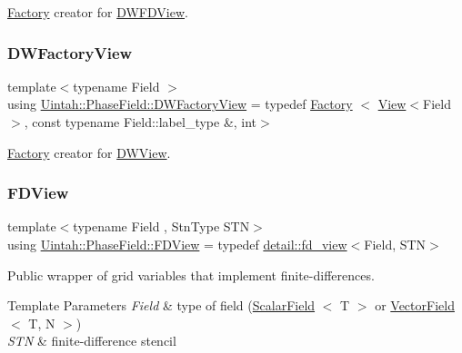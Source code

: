 \hyperlink{classUintah_1_1PhaseField_1_1Factory}{Factory} creator for \hyperlink{classUintah_1_1PhaseField_1_1DWFDView}{D\+W\+F\+D\+View}. 

\mbox{\label{namespaceUintah_1_1PhaseField_a04193a30328f38b29159b738067c8552}} 
\subsubsection{\texorpdfstring{D\+W\+Factory\+View}{DWFactoryView}}
{\footnotesize\ttfamily template$<$typename Field $>$ \\
using \hyperlink{namespaceUintah_1_1PhaseField_a04193a30328f38b29159b738067c8552}{Uintah\+::\+Phase\+Field\+::\+D\+W\+Factory\+View} = typedef \hyperlink{classUintah_1_1PhaseField_1_1Factory}{Factory} $<$ \hyperlink{namespaceUintah_1_1PhaseField_a59210a1e28eba254d428762c92ddeabb}{View}$<$Field$>$, const typename Field\+::label\+\_\+type \&, int$>$}



\hyperlink{classUintah_1_1PhaseField_1_1Factory}{Factory} creator for \hyperlink{classUintah_1_1PhaseField_1_1DWView}{D\+W\+View}. 

\mbox{\label{namespaceUintah_1_1PhaseField_a63032464b1cd54eaa53c1c29109746ac}} 
\subsubsection{\texorpdfstring{F\+D\+View}{FDView}}
{\footnotesize\ttfamily template$<$typename Field , Stn\+Type S\+TN$>$ \\
using \hyperlink{namespaceUintah_1_1PhaseField_a63032464b1cd54eaa53c1c29109746ac}{Uintah\+::\+Phase\+Field\+::\+F\+D\+View} = typedef \hyperlink{classUintah_1_1PhaseField_1_1detail_1_1fd__view}{detail\+::fd\+\_\+view}$<$Field, S\+TN$>$}



Public wrapper of grid variables that implement finite-\/differences. 


\begin{DoxyTemplParams}{Template Parameters}
{\em Field} & type of field (\hyperlink{structUintah_1_1PhaseField_1_1ScalarField}{Scalar\+Field} $<$ T $>$ or \hyperlink{structUintah_1_1PhaseField_1_1VectorField}{Vector\+Field} $<$ T, N $>$) \\
\hline
{\em S\+TN} & finite-\/difference stencil \\
\hline
\end{DoxyTemplParams}
\mbox{\label{namespaceUintah_1_1PhaseField_af786d8e2489272b1c6903a1377df1f1b}} 

